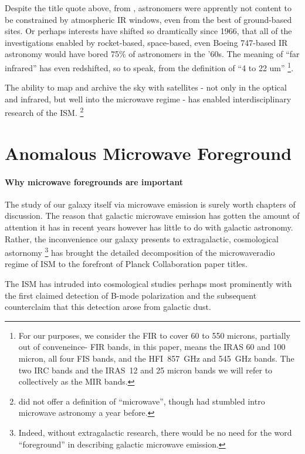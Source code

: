   Despite the title quote above, from \citep{johnson66}, astronomers were apprently not content to be constrained by atmospheric IR windows, even from the best of ground-based sites. Or perhaps interests have shifted so dramtically since 1966, that all of the investigations enabled by rocket-based, space-based, even Boeing 747-based IR astronomy would have bored 75\% of astronomers in the '60s. The meaning of ``far infrared'' has even redshifted, so to speak, from the \cite{johnson66} definition of ``4 to 22 um''
   \footnote{\footnotesize For our purposes, we consider the FIR to cover 60 to 550 microns, partially out of conveneince- FIR bands, in this paper, means the IRAS 60 and 100 micron, all four FIS bands, and the HFI~857~GHz and 545~GHz bands. The two IRC bands and the IRAS~12 and 25 micron bands we will refer to collectively as the MIR bands.}.

  The ability to map and archive the sky with satellites - not only in the optical and infrared, but well into the microwave regime - has enabled interdisciplinary research of the ISM.  \footnote{\cite{johnson66} did not offer a definition of ``microwave'', though \cite{penzias65} had stumbled intro microwave astronomy a year before. }

\section{Anomalous Microwave Foreground}

  \paragraph{Why microwave foregrounds are important}
    The study of our galaxy itself via microwave emission is surely worth chapters of discussion. The reason that galactic microwave emission has gotten the amount of attention it has in recent years however has little to do with galactic astronomy. Rather, the inconvenience our galaxy presents to extragalactic, cosmological astornomy \footnote{Indeed, without extragalactic research, there would be no need for the word ``foreground'' in describing galactic microwave emission.} has brought the detailed decomposition of the microwave\-radio regime of ISM to the forefront of Planck Collaboration paper titles.

    The ISM has intruded into cosmological studies perhaps most prominently with the first claimed detection of B-mode polarization \citep{hanson13, bicep214, flauger14} and the subsequent counter\-claim that this detection arose from galactic dust.

